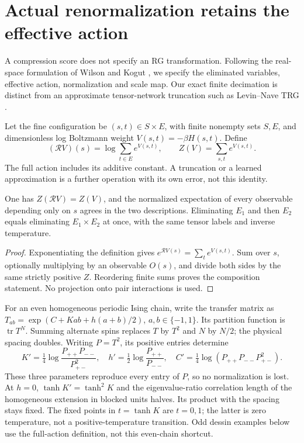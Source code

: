 \section{Actual renormalization retains the effective action}
\label{sec:actual-rg}
A compression score does not specify an RG transformation. Following the
real-space formulation of Wilson and Kogut \cite{WilsonKogutRG}, we specify
the eliminated variables, effective action, normalization and scale map.
Our exact finite decimation is distinct from an approximate tensor-network
truncation such as Levin--Nave TRG \cite{LevinNaveRG}.

\begin{definition}
Let the fine configuration be $(s,t)\in S\times E $, with finite nonempty
sets $ S,E $, and dimensionless log Boltzmann weight $ V(s,t)=-\beta H(s,t)$.
Define
\[
 (\mathcal RV)(s)=\log\sum_{t\in E}e^{V(s,t)},\qquad
 Z(V)=\sum_{s,t}e^{V(s,t)}.
\]
The full action includes its additive constant. A truncation or a learned
approximation is a further operation with its own error, not this identity.
\end{definition}
\begin{proposition}\label{rg:exact}
One has $ Z(\mathcal RV)=Z(V)$, and the normalized expectation of every
observable depending only on $ s $ agrees in the two descriptions. Eliminating
$ E_1$ and then $ E_2$ equals eliminating $ E_1\times E_2$ at once, with the
same tensor labels and inverse temperature.
\end{proposition}
\begin{proof}
Exponentiating the definition gives $ e^{\mathcal RV(s)}=\sum_te^{V(s,t)}$.
Sum over $ s $, optionally multiplying by an observable $ O(s)$, and divide
both sides by the same strictly positive $ Z $. Reordering finite sums proves
the composition statement. No projection onto pair interactions is used.
\end{proof}

For an even homogeneous periodic Ising chain, write the transfer matrix as
$ T_{ab}=\exp(C+Kab+h(a+b)/2)$, $ a,b\in\{-1,1\}$.
Its partition function is $\operatorname{tr}T^N $. Summing alternate spins
replaces $ T $ by $ T^2$ and $ N $ by $ N/2$; the physical spacing doubles.
Writing $ P=T^2$, its positive entries determine
\[
 K'=\tfrac 14\log\frac{P_{++}P_{--}}{P_{+-}^2},\quad
 h'=\tfrac 12\log\frac{P_{++}}{P_{--}},\quad
 C'=\tfrac 14\log(P_{++}P_{--}P_{+-}^2).
\]
These three parameters reproduce every entry of $ P $, so no normalization
is lost. At $ h=0$, $\tanh K'=\tanh^2 K $ and the eigenvalue-ratio correlation length of the homogeneous extension
in blocked units halves. Its product with the spacing stays fixed. The
fixed points in $ t=\tanh K $ are $ t=0,1$; the latter is zero temperature,
not a positive-temperature transition. Odd dessin examples below use the
full-action definition, not this even-chain shortcut.

